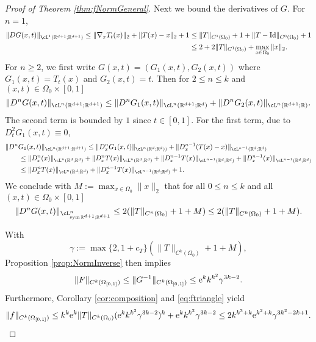 \begin{proof}[Proof of Theorem \ref{thm:fNormGeneral}]
Next we bound the derivatives of $G$.
For $n=1$,
\begin{align*}
  \|DG(x,t)\|_{\cL^1(\R^{d+1};\R^{d+1})}\le \|\nabla_x T_t(x)\|_2+\|T(x)-x\|_2+1
  &\le \|T\|_{C^1(\Omega_0)}+1+\|T-{\rm Id}\|_{C^0(\Omega_0)}+1\nonumber\\
  &\le 2+2\|T\|_{C^1(\Omega_0)}+\max_{x\in\Omega_0}\|x\|_2.
\end{align*}
For $n\ge 2$, we first write $G(x,t)=(G_1(x,t),G_2(x,t))$ where
$G_1(x,t)=T_t(x)$ and $G_2(x,t)=t$. Then for $2\le n\le k$ and
$(x,t)\in\Omega_0\times [0,1]$
\begin{equation*}
  \|D^nG(x,t)\|_{\cL^n(\R^{d+1};\R^{d+1})}\le
  \|D^nG_1(x,t)\|_{\cL^n(\R^{d+1};\R^{d})}+
  \|D^nG_2(x,t)\|_{\cL^n(\R^{d+1};\R)}.
\end{equation*}
The second term is bounded by $1$ since $t\in [0,1]$. For the first term,
due to $D_t^2G_1(x,t)\equiv 0$,
\begin{align*}
  &\|D^n G_1(x,t)\|_{\cL^n(\R^{d+1};\R^{d+1})}
    \le \|D_x^n G_1(x,t)\|_{\cL^n(\R^d;\R^d))}
    +\|D_x^{n-1} (T(x)-x)\|_{\cL^{n-1}(\R^d;\R^d)}\nonumber\\
  &\qquad \le \|D_x^n (x)\|_{\cL^n(\R^{d};\R^{d})}+\|D_x^n T(x)\|_{\cL^n(\R^{d};\R^{d})}
    +\|D_x^{n-1} T(x)\|_{\cL^{n-1}(\R^d;\R^d)}
    +\|D_x^{n-1} (x)\|_{\cL^{n-1}(\R^d;\R^d)}\nonumber\\
  &\qquad\le \|D_x^n T(x)\|_{\cL^n(\R^{d};\R^{d})}+\|D_x^{n-1} T(x)\|_{\cL^{n-1}(\R^{d};\R^{d})}+1.
\end{align*}
We conclude with $M:=\max_{x\in\Omega_0}\|x\|_2$
that for all $0 \le n\le k$ and all $(x,t)\in \Omega_0\times [0,1]$
\begin{equation*}
  \|D^nG(x,t)\|_{\cL^n_{\sym{\R^{d+1};\R^{d+1}}}}\le 2(\|T\|_{C^n(\Omega_0)}+1+M)\le 2(\|T\|_{C^k(\Omega_0)}+1+M).
\end{equation*}


With
\begin{equation*}
  \gamma :=\max\{2,1+c_T\}(\|T\|_{C^k(\Omega_0)}+1+M),
\end{equation*}
Proposition \ref{prop:NormInverse} then implies
\begin{equation*}
  \|F\|_{C^k(\Omega_{[0,1]})}\le
  \|G^{-1}\|_{C^k(\Omega_{[0,1]})}\le \mathrm{e}^kk^{k^2}\gamma^{3k-2}.
\end{equation*}
Furthermore, Corollary \ref{cor:composition} and \eqref{eq:ftriangle}
yield
\begin{equation*}
  \|f\|_{C^k(\Omega_{[0,1]})}\le k^k\mathrm{e}^{k}\|T\|_{C^k(\Omega_0)}(\mathrm{e}^kk^{k^2}\gamma^{3k-2})^k+
  \mathrm{e}^kk^{k^2}\gamma^{3k-2}
  \le 2k^{k^3 + k}\mathrm{e}^{k^2+k}\gamma^{3k^2-2k+1}.
\end{equation*}
\end{proof}

